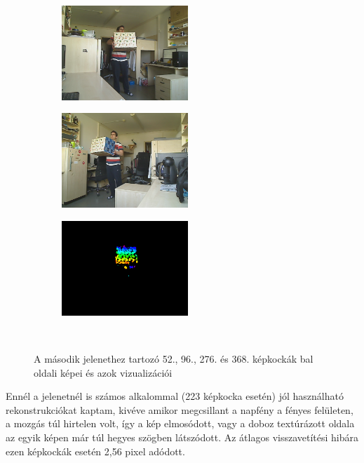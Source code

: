 \begin{figure}
\begin{subfigure}[b]{.32\linewidth}
  \end{subfigure}\\\vspace{5pt}
\begin{subfigure}[b]{.32\linewidth}
	\centering
	\includegraphics[width=135pt]{figures/scene3/left_468.png}
  \end{subfigure}
\begin{subfigure}[b]{.32\linewidth}
	\centering
	\includegraphics[width=135pt]{figures/scene3/right_468.png}
  \end{subfigure}
\begin{subfigure}[b]{.32\linewidth}
	\centering
	\includegraphics[width=135pt]{figures/scene3/vis_468.png}
  \end{subfigure}\\\vspace{5pt}
\caption{A második jelenethez tartozó 52., 96., 276. és 368. képkockák bal oldali képei és azok vizualizációi \label{fig:scene3_frames}}

\end{figure}

Ennél a jelenetnél is számos alkalommal (223 képkocka esetén) jól használható rekonstrukciókat kaptam, kivéve amikor megcsillant a napfény a fényes felületen, a mozgás túl hirtelen volt, így a kép elmosódott, vagy a doboz textúrázott oldala az egyik képen már túl hegyes szögben látszódott. Az átlagos visszavetítési hibára ezen képkockák esetén 2,56 pixel adódott.


